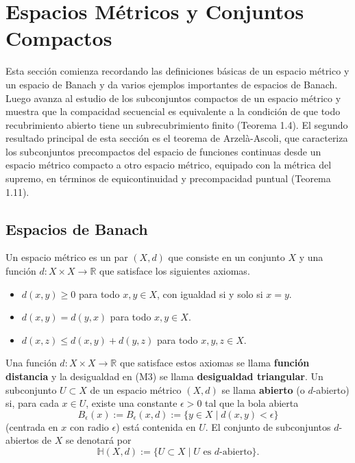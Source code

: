 \section{Espacios Métricos y Conjuntos Compactos}

Esta sección comienza recordando las definiciones básicas de un espacio métrico y un espacio de Banach y da varios ejemplos importantes de espacios de Banach. Luego avanza al estudio de los subconjuntos compactos de un espacio métrico y muestra que la compacidad secuencial es equivalente a la condición de que todo recubrimiento abierto tiene un subrecubrimiento finito (Teorema 1.4). El segundo resultado principal de esta sección es el teorema de Arzelà-Ascoli, que caracteriza los subconjuntos precompactos del espacio de funciones continuas desde un espacio métrico compacto a otro espacio métrico, equipado con la métrica del supremo, en términos de equicontinuidad y precompacidad puntual (Teorema 1.11).

\subsection{Espacios de Banach}

\begin{definition} 
Un espacio métrico es un par $(X, d)$ que consiste en un conjunto $X$ y una función
$d:X\times X\rightarrow\mathbb{R}$
que satisface los siguientes axiomas.
\begin{itemize}
    \item[(M1)] $d(x,y)\ge0$ para todo $x,y\in X$, con igualdad si y solo si $x=y$.
    \item[(M2)] $d(x,y)=d(y,x)$ para todo $x,y\in X$.
    \item[(M3)] $d(x,z)\le d(x,y)+d(y,z)$ para todo $x,y,z\in X$.
\end{itemize}
\end{definition}

Una función $d:X\times X\rightarrow\mathbb{R}$ que satisface estos axiomas se llama \textbf{función distancia} y la desigualdad en (M3) se llama \textbf{desigualdad triangular}. Un subconjunto $U\subset X$ de un espacio métrico $(X,d)$ se llama \textbf{abierto} (o $d$-abierto) si, para cada $x\in U$, existe una constante $\epsilon>0$ tal que la bola abierta
\[ B_{\epsilon}(x) := B_{\epsilon}(x,d) := \{y\in X \mid d(x,y)<\epsilon\} \]
(centrada en $x$ con radio $\epsilon$) está contenida en $U$. El conjunto de subconjuntos $d$-abiertos de $X$ se denotará por
\[ \mathbb{H}(X, d) := \{U \subset X \mid U \text{ es } d\text{-abierto}\}. \]

